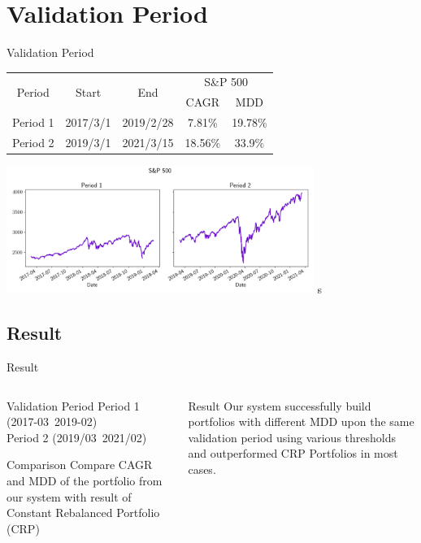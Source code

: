\section{Validation Period}
\centering
\begin{frame}{Validation Period}
\begin{tabular}{||c|c|c|c|c||}
    \hline \hline
    \multirow{2}{*}{Period} &
    \multirow{2}{*}{Start} &
    \multirow{2}{*}{End} &
    \multicolumn{2}{c|}{S\&P 500} \\ 
    \cline{4-5} &{} &{} & CAGR & MDD \\ \hline \hline
    Period 1 & 2017/3/1 & 2019/2/28 & 7.81\% & 19.78\% \\ \hline
    Period 2 & 2019/3/1 & 2021/3/15 & 18.56\% & 33.9\% \\    
    \hline \hline
    \end{tabular}
      \centering
    \includegraphics[width=10cm]{images/sp500.png}
s
\end{frame}


\subsection{Result}
\begin{frame}{Result}

\begin{columns}[t]
\begin{column}{0.5\textwidth}
\begin{block}{Validation Period}
Period 1 (2017-03~2019-02) 
\\
Period 2 (2019/03~2021/02)
\end{block}
\begin{block}{Comparison}
Compare CAGR and MDD of the portfolio from our system with result of Constant Rebalanced Portfolio (CRP)
\end{block}
\end{column}

\begin{column}{0.5\textwidth}
\begin{block}{Result}
Our system successfully build portfolios with different MDD upon the same validation period using various thresholds and outperformed CRP Portfolios in most cases.
\end{block}
\end{column}
\end{columns}
\end{frame}

